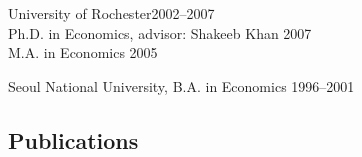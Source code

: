 \documentclass[12pt]{article}
\begin{document}
\begin{description}
\item \hspace{0.2in}University of Rochester\hfill 2002--2007\\
\hspace{0.4in} Ph.D. in Economics, advisor: Shakeeb Khan \hfill 2007\\
\hspace{0.4in} M.A. in Economics \hfill 2005

\item \hspace{0.2in}Seoul National University, B.A. in Economics \hfill 1996--2001
\end{description}

\subsection*{Publications}
\end{document}
